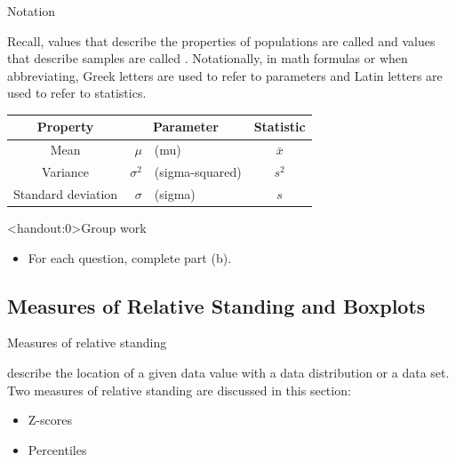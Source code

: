\documentclass[xcolor=table, handout]{beamer}
\begin{document}
\begin{frame}{Notation}
\begin{block}{}
\large
Recall, values that describe the properties of populations are called  and values that describe samples are called . Notationally, in math formulas or when abbreviating, Greek letters are used to refer to parameters and Latin letters are used to refer to statistics.
\pause
\begin{center}
\begin{tabular}{c |r l | c}
Property & \multicolumn{2}{c|}{Parameter} & Statistic\\
\hline
Mean & $\mu$ & (mu) & $\bar x$\\
Variance & $\sigma^2$ &(sigma-squared) & $s^2$\\
Standard deviation & $\sigma$ &(sigma) & $s$
\end{tabular}
\end{center} 
\end{block}
\end{frame}


\begin{frame}<handout:0>{Group work}
\begin{block}{}
\large
\begin{itemize}
\item For each question, complete part (b).
\end{itemize}
\end{block}
\end{frame}

\subsection{Measures of Relative Standing and Boxplots}

\begin{frame}{Measures of relative standing}
\begin{block}{}
\large
{} describe the location of a given data value with a data distribution or a data set.\\
\medskip
Two measures of relative standing are discussed in this section:
\begin{itemize}
\item Z-scores
\item Percentiles
\end{itemize}
\end{block}
\end{frame}
\end{document}
